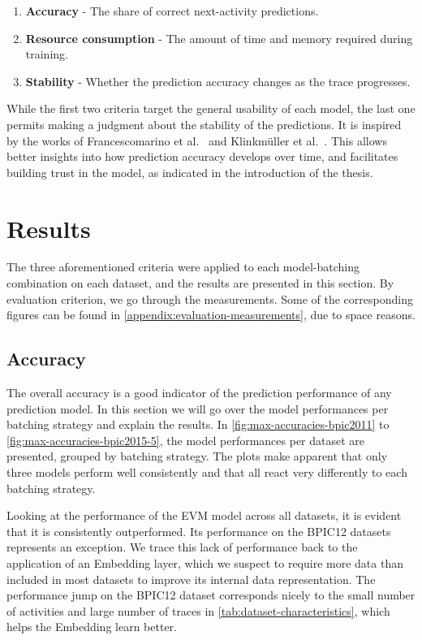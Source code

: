 \begin{enumerate}
    \item\textbf{Accuracy} - The share of correct next-activity predictions.
    \item\textbf{Resource consumption} - The amount of time and memory required during training.
    \item\textbf{Stability} - Whether the prediction accuracy changes as the trace progresses.
\end{enumerate}

While the first two criteria target the general usability of each model, the last one permits making a judgment about the stability of the predictions. It is inspired by the works of Francescomarino et al.~\cite{francescomarino2015} and Klinkmüller et al.~\cite{klinkmuller2018reliablemonitoring}. This allows better insights into how prediction accuracy develops over time, and facilitates building trust in the model, as indicated in the introduction of the thesis.

\section{Results}\label{sec:eval:results}
The three aforementioned criteria were applied to each model-batching combination on each dataset, and the results are presented in this section. By evaluation criterion, we go through the measurements. Some of the corresponding figures can be found in \autoref{appendix:evaluation-measurements}, due to space reasons.

\subsection*{Accuracy}
The overall accuracy is a good indicator of the prediction performance of any prediction model. In this section we will go over the model performances per batching strategy and explain the results. In \autoref{fig:max-accuracies-bpic2011} to \autoref{fig:max-accuracies-bpic2015-5}, the model performances per dataset are presented, grouped by batching strategy. The plots make apparent that only three models perform well consistently and that all react very differently to each batching strategy.

Looking at the performance of the EVM model across all datasets, it is evident that it is consistently outperformed. Its performance on the BPIC12 datasets represents an exception. We trace this lack of performance back to the application of an Embedding layer, which we suspect to require more data than included in most datasets to improve its internal data representation. The performance jump on the BPIC12 dataset corresponds nicely to the small number of activities and large number of traces in \autoref{tab:dataset-characteristics}, which helps the Embedding learn better.


